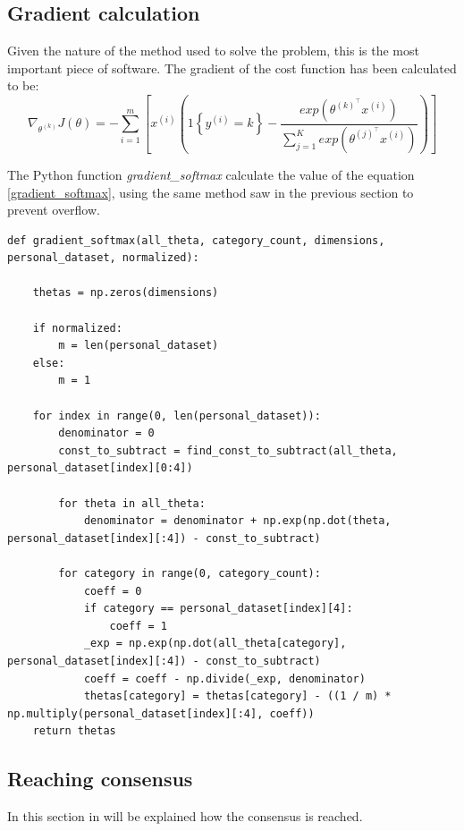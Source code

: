 \documentclass[a4paper,11pt,oneside]{book}
\begin{document}
\subsection{Gradient calculation}
Given the nature of the method used to solve the problem, this is the most important piece of software. The gradient of the cost function has been calculated to be:
\begin{equation}
	\nabla_{\theta^{(k)}}J(\theta) = - \sum_{i=1}^{m} \left[ x^{(i)} \left( 1 \left\{ y^{(i)}=k \right\} -     \dfrac{exp\left(\theta^{(k)^{\top}}x^{(i)} \right)}{ \sum_{j=1}^{K} exp\left(\theta^{(j)^{\top}}x^{(i)} \right)}      \right) \right]
	\label{gradient_softmax}
\end{equation}

The Python function \textit{gradient\_softmax} calculate the value of the equation \ref{gradient_softmax}, using the same method saw in the previous section to prevent overflow.

\begin{lstlisting}
def gradient_softmax(all_theta, category_count, dimensions, personal_dataset, normalized):

    thetas = np.zeros(dimensions)

    if normalized:
        m = len(personal_dataset)
    else:
        m = 1

    for index in range(0, len(personal_dataset)):
        denominator = 0
        const_to_subtract = find_const_to_subtract(all_theta, personal_dataset[index][0:4])

        for theta in all_theta:
            denominator = denominator + np.exp(np.dot(theta, personal_dataset[index][:4]) - const_to_subtract)

        for category in range(0, category_count):
            coeff = 0
            if category == personal_dataset[index][4]:
                coeff = 1
            _exp = np.exp(np.dot(all_theta[category], personal_dataset[index][:4]) - const_to_subtract)
            coeff = coeff - np.divide(_exp, denominator)
            thetas[category] = thetas[category] - ((1 / m) * np.multiply(personal_dataset[index][:4], coeff))
    return thetas
\end{lstlisting}

\subsection {Reaching consensus}

In this section in will be explained how the consensus is reached.\\
\end{document}
